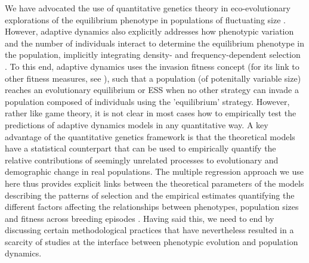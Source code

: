 \documentclass{article}
\begin{document}
We have advocated the use of quantitative genetics theory in eco-evolutionary explorations of the equilibrium phenotype in populations of fluctuating size \citep{Engen2013, Engen2020, Lande2017, Lande2009a}. However, adaptive dynamics also explicitly addresses how phenotypic variation and the number of individuals interact to determine the equilibrium phenotype in the population, implicitly integrating density- and frequency-dependent selection \citep{McGill2007}. To this end, adaptive dynamics uses the invasion fitness concept (for its link to other fitness measures, see \cite{Lehmann2016}), such that a population (of potenitally variable size) reaches an evolutionary equilibrium or ESS when no other strategy can invade a population composed of individuals using the 'equilibrium' strategy. However, rather like game theory, it is not clear in most cases how to empirically test the predictions of adaptive dynamics models in any quantitative way. A key advantage of the quantitative genetics framework is that the theoretical models have a statistical counterpart that can be used to empirically quantify the relative contributions of seemingly unrelated processes to evolutionary and demographic change in real populations. The multiple regression approach we use here thus provides explicit links between the theoretical parameters of the models describing the patterns of selection and the empirical estimates quantifying the different factors affecting the relationships between phenotypes, population sizes and fitness across breeding episodes \citep{Lande1983, Queller1992, Wolf1999SocialSelection, Heisler1987, Goodnight1992}. Having said this, we need to end by discussing certain methodological practices that have nevertheless resulted in a scarcity of studies at the interface between phenotypic evolution and population dynamics.
\end{document}
